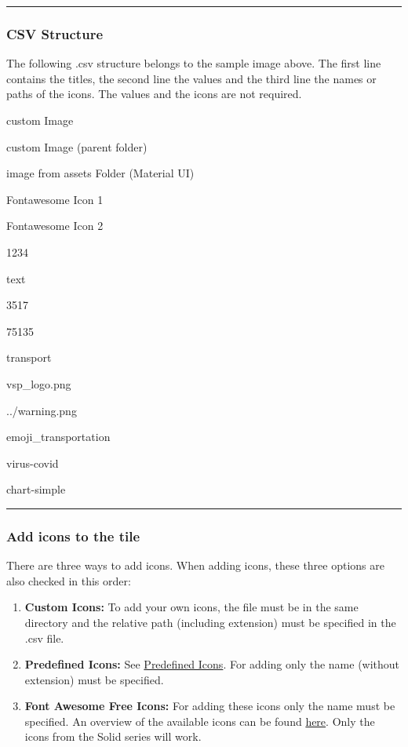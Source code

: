 \begin{center}\rule{0.5\linewidth}{0.5pt}\end{center}

\hypertarget{csv-structure}{%
\subsubsection{CSV Structure}\label{csv-structure}}

The following .csv structure belongs to the sample image above. The
first line contains the titles, the second line the values and the third
line the names or paths of the icons. The values and the icons are not
required.

custom Image

custom Image (parent folder)

image from assets Folder (Material UI)

Fontawesome Icon 1

Fontawesome Icon 2

1234

text

3517

75135

transport

vsp\_logo.png

../warning.png

emoji\_transportation

virus-covid

chart-simple

\begin{center}\rule{0.5\linewidth}{0.5pt}\end{center}

\hypertarget{add-icons-to-the-tile}{%
\subsubsection{Add icons to the tile}\label{add-icons-to-the-tile}}

There are three ways to add icons. When adding icons, these three
options are also checked in this order:

\begin{enumerate}
\def\labelenumi{\arabic{enumi}.}
\item
  \textbf{Custom Icons:} To add your own icons, the file must be in the
  same directory and the relative path (including extension) must be
  specified in the .csv file.
\item
  \textbf{Predefined Icons:} See
  \protect\hyperlink{ux5cux23ux5cux23predefined-icons}{Predefined
  Icons}. For adding only the name (without extension) must be
  specified.
\item
  \textbf{Font Awesome Free Icons:} For adding these icons only the name
  must be specified. An overview of the available icons can be found
  \href{https://fontawesome.com/search?o=r\&m=free\&s=solid}{here}. Only
  the icons from the Solid series will work.
\end{enumerate}

